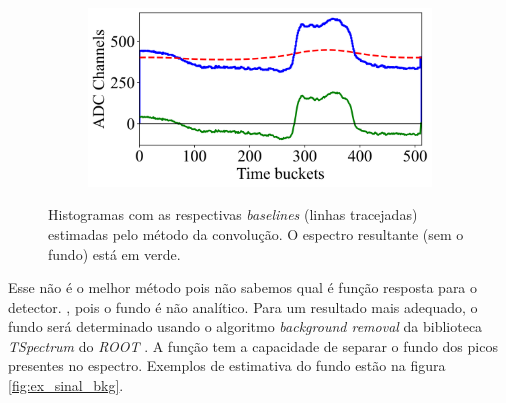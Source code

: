 \documentclass[a4paper,12pt,oneside]{book}
\begin{document}
\begin{figure}[H]
\begin{subfigure}[b]{0.45\textwidth}
        \caption{}
        \label{subfig:bs_fourier_3}
    \end{subfigure}%
    \hfill
    \begin{subfigure}[b]{0.45\textwidth}
        \centering
        \includegraphics[scale=0.45]{figs/bs_fourier_4.png}
        \caption{}
        \label{subfig:bs_fourier_4}
    \end{subfigure}
\caption{Histogramas com as respectivas \textit{baselines} (linhas tracejadas) estimadas pelo método da convolução. O espectro resultante (sem o fundo) está em verde.}
\label{fig:bs_fourier_exs}
\end{figure}


\par Esse não é o melhor método pois não sabemos qual é função resposta para o detector. , pois o fundo é não analítico\cite{GET}. Para um resultado mais adequado, o fundo será determinado usando o algoritmo \textit{background removal} da biblioteca \textit{TSpectrum} do \textit{ROOT} \cite{root}. A função tem a capacidade de separar o fundo dos picos presentes no espectro\cite{BKG_1, BKG_2, BKG_3}. Exemplos de estimativa do fundo estão na figura \ref{fig:ex_sinal_bkg}.
\end{document}
